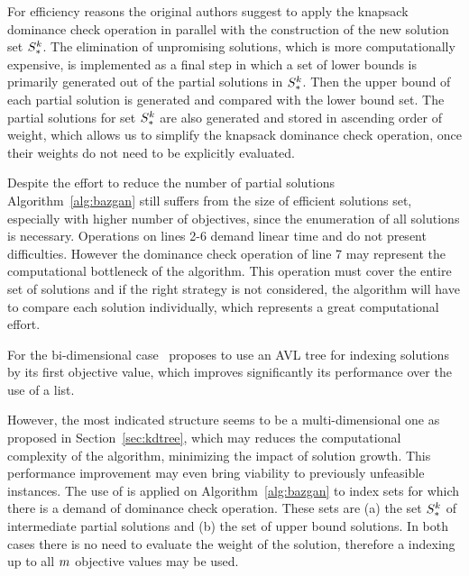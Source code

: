 For efficiency reasons the original authors
suggest to apply the knapsack dominance check operation
in parallel with the construction of the new solution set $S_*^k$.
The elimination of unpromising solutions, which is more
computationally expensive, is implemented as a final step in which
a set of lower bounds is primarily generated
out of the partial solutions in $S_*^k$.
Then the upper bound of each partial solution is
generated and compared with the lower bound set.
The partial solutions for set $S_*^k$ are also
generated and stored in ascending order of weight,
which allows us to simplify the knapsack dominance
check operation, once their weights do not need to be
explicitly evaluated.

Despite the effort to reduce the number of partial solutions
Algorithm~\ref{alg:bazgan} still suffers from the size of
efficient solutions set,
especially with higher number of objectives,
since the enumeration of all solutions is necessary.
Operations on lines 2-6 demand linear time and do not present  difficulties.
However the dominance check operation of line 7
may represent the computational bottleneck of the algorithm.
This operation must cover the entire set of solutions and if
the right strategy is not considered, the algorithm
will have to compare each solution individually,
which represents a great computational effort.

For the bi-dimensional case~\cite{bazgan2009} proposes
to use an AVL tree for  indexing solutions by its
first objective value, which improves significantly
its performance over the use of a list.

However, the most indicated structure seems to be a
multi-dimensional one as proposed in Section~\ref{sec:kdtree},
which may reduces the computational complexity of the algorithm,
minimizing the impact of solution growth.
This performance improvement may even bring
viability to previously unfeasible instances.
The use of \kdtree{} is applied on Algorithm~\ref{alg:bazgan}
to index sets for which there is a demand of dominance check operation.
These sets are (a) the set $S_*^k$ of intermediate partial solutions
and (b) the set of upper bound solutions.
In both cases there is no need to evaluate the weight of the solution,
therefore a \kdtree{} indexing up to all $m$ objective values may be used.
